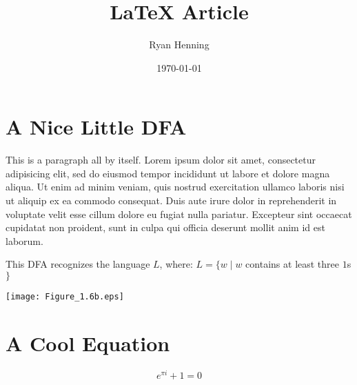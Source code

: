\documentclass{article}
\title{LaTeX Article}
\author{Ryan Henning}
\date{\today}
\begin{document}
\maketitle


\section{A Nice Little DFA}

This is a paragraph all by itself. Lorem ipsum dolor sit amet, consectetur adipisicing elit, sed do eiusmod tempor incididunt ut labore et dolore magna aliqua. Ut enim ad minim veniam, quis nostrud exercitation ullamco laboris nisi ut aliquip ex ea commodo consequat. Duis aute irure dolor in reprehenderit in voluptate velit esse cillum dolore eu fugiat nulla pariatur. Excepteur sint occaecat cupidatat non proident, sunt in culpa qui officia deserunt mollit anim id est laborum.

This DFA recognizes the language $L$, where:
$L = \{w \mid w$ contains at least three $1$s$\}$
\begin{center}
\texttt{[image: Figure\_1.6b.eps]}
\end{center}


\section{A Cool Equation}

$$e^{\pi i} + 1 = 0$$
\end{document}
